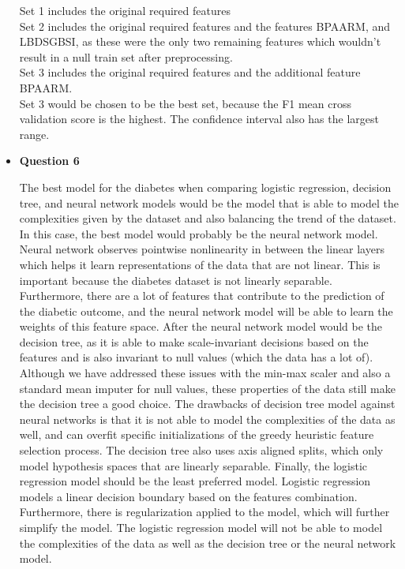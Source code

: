 \documentclass[12pt]{article}
\begin{document}
\begin{itemize}
  Set 1 includes the original required features \\ 
  Set 2 includes the original required features and the features BPAARM, and LBDSGBSI, as these were the only two remaining features which wouldn't result in a null train set after preprocessing.\\ 
  Set 3 includes the original required features and the additional feature BPAARM. \\ 

  Set 3 would be chosen to be the best set, because the F1 mean cross validation score is the highest. The confidence interval also has the largest range.


  \item \textbf{Question 6}
  
  The best model for the diabetes when comparing logistic regression, decision tree, and neural network models would be the model that is able to model the complexities given by the dataset and also balancing the trend of the dataset. In this case, the best model would probably be the neural network model. Neural network observes pointwise nonlinearity in between the linear layers which helps it learn representations 
  of the data that are not linear. This is important because the diabetes dataset is not linearly separable. Furthermore, there are a lot of features that contribute to the prediction of the diabetic outcome, and the neural network model will be able to learn the weights of this feature space. After the neural network model would be the decision tree, as it is able to make scale-invariant decisions based on the features and is also invariant to null values (which the data has a lot of). Although we have addressed
  these issues with the min-max scaler and also a standard mean imputer for null values, these properties of the data still make the decision tree a good choice. The drawbacks of decision tree model against neural networks is that it is not able to model the complexities of the data as well, and can overfit specific initializations of the greedy heuristic feature selection 
  process. The decision tree also uses axis aligned splits, which only model hypothesis spaces that are linearly separable. Finally, the logistic regression model should be the least preferred model. Logistic regression models a linear decision boundary based on the features combination. Furthermore, there is regularization applied to the model, which will further simplify the model. The logistic regression model will not be able to model the complexities of the data as well as the decision tree or the neural network model.



\end{itemize}
\end{document}
